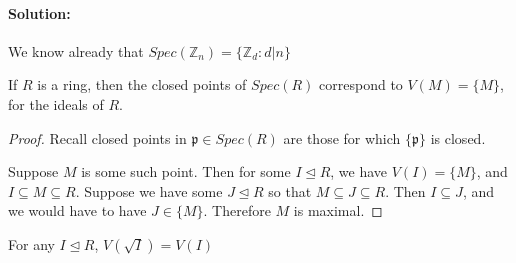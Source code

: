 \documentclass{article}
\theoremstyle{plain}%
\newtheorem[L]{thm}{Theorem}[section]
\newtheorem[L]{lem}[thm]{Lemma}
\newtheorem[L]{prop}[thm]{Proposition}
\theoremstyle{definition}
\newtheorem[M]{defn}{Definition}[section]
\newtheorem[M]{exmp}{Example}[section]
\theoremstyle{remark}
\begin{document}
\paragraph{Solution: }We know already that $Spec(\mathbb{Z}_n)=\{\mathbb{Z}_d:d|n\} $
\begin{prop}
    If $R$ is a ring, then the closed points of $Spec(R)$ correspond to $V(M)=\{M\} $, for the ideals of $R$.
\end{prop}
\begin{proof} 
    Recall closed points in $\mathfrak{p}\in Spec(R)$ are those for which $\{\mathfrak{p}\}$ is closed.

    Suppose $M$ is some such point. Then for some $I\trianglelefteq R$, we have $V(I)=\{M\} $, and $I\subseteq M\subseteq R$. Suppose we have some $J\trianglelefteq R$ so that $M\subseteq J\subseteq R$. Then $I\subseteq J$, and we would have to have  $J\in \{M\} $. Therefore $M$ is maximal. 
\end{proof}
\begin{prop}
    For any $I\trianglelefteq R$, $V(\sqrt{I} )=V(I)$
\end{prop}
\end{document}
